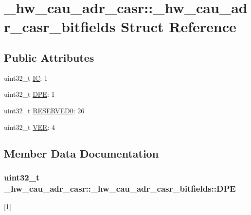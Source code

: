 \hypertarget{struct__hw__cau__adr__casr_1_1__hw__cau__adr__casr__bitfields}{}\section{\+\_\+hw\+\_\+cau\+\_\+adr\+\_\+casr\+:\+:\+\_\+hw\+\_\+cau\+\_\+adr\+\_\+casr\+\_\+bitfields Struct Reference}
\label{struct__hw__cau__adr__casr_1_1__hw__cau__adr__casr__bitfields}
\subsection*{Public Attributes}
\begin{DoxyCompactItemize}
\item 
uint32\+\_\+t \hyperlink{struct__hw__cau__adr__casr_1_1__hw__cau__adr__casr__bitfields_a8332eeb32944fc514118fad663e15dc0}{IC}\+: 1
\item 
uint32\+\_\+t \hyperlink{struct__hw__cau__adr__casr_1_1__hw__cau__adr__casr__bitfields_adb415573cb62fcebfcbae859dddbfbc7}{D\+PE}\+: 1
\item 
uint32\+\_\+t \hyperlink{struct__hw__cau__adr__casr_1_1__hw__cau__adr__casr__bitfields_a60cbe587a41e81559dbd2b4a1d0eb969}{R\+E\+S\+E\+R\+V\+E\+D0}\+: 26
\item 
uint32\+\_\+t \hyperlink{struct__hw__cau__adr__casr_1_1__hw__cau__adr__casr__bitfields_add6a5d2579b4ab1d9ba3ce331142d638}{V\+ER}\+: 4
\end{DoxyCompactItemize}


\subsection{Member Data Documentation}
\subsubsection[{\texorpdfstring{D\+PE}{DPE}}]{\setlength{\rightskip}{0pt plus 5cm}uint32\+\_\+t \+\_\+hw\+\_\+cau\+\_\+adr\+\_\+casr\+::\+\_\+hw\+\_\+cau\+\_\+adr\+\_\+casr\+\_\+bitfields\+::\+D\+PE}\hypertarget{struct__hw__cau__adr__casr_1_1__hw__cau__adr__casr__bitfields_adb415573cb62fcebfcbae859dddbfbc7}{}\label{struct__hw__cau__adr__casr_1_1__hw__cau__adr__casr__bitfields_adb415573cb62fcebfcbae859dddbfbc7}
\mbox{[}1\mbox{]} 
